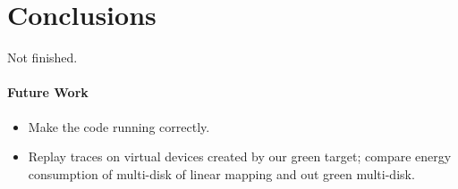 \section{Conclusions}
\label{conc}
Not finished.

\paragraph{Future Work} 
%

\begin{itemize}
\item Make the code running correctly. 

\item Replay traces on virtual devices created by our green target;
compare energy consumption of multi-disk of linear mapping and out
green multi-disk.
\end{itemize}

